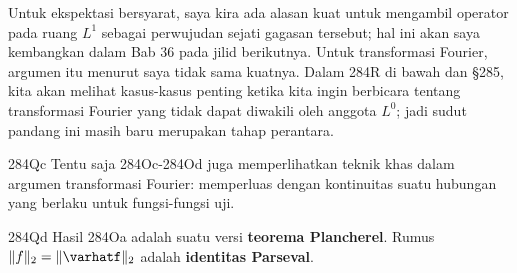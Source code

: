 {Untuk ekspektasi bersyarat, saya kira ada alasan kuat untuk mengambil operator
pada ruang $L^1$ sebagai perwujudan sejati gagasan tersebut; hal ini akan saya
kembangkan dalam Bab 36 pada jilid berikutnya. Untuk transformasi Fourier,
argumen itu menurut saya tidak sama kuatnya. Dalam 284R di bawah dan \S285,
kita akan melihat kasus-kasus penting ketika kita ingin berbicara tentang
transformasi Fourier yang tidak dapat diwakili oleh anggota $L^0$; jadi sudut
pandang ini masih baru merupakan tahap perantara.

\spheader 284Qc Tentu saja 284Oc-284Od juga memperlihatkan teknik khas dalam
argumen transformasi Fourier: memperluas dengan kontinuitas suatu hubungan
yang berlaku untuk fungsi-fungsi uji.

\spheader 284Qd Hasil 284Oa adalah suatu versi {\bf teorema Plancherel}. Rumus
$\|f\|_2=\|\varhatf\|_2$ adalah {\bf identitas Parseval}. }%

